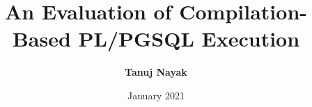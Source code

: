 \documentclass[12pt]{cmuthesis}
\begin{document}
 
\frontmatter

\pagestyle{empty}

\title{ %
{\bf An Evaluation of Compilation-Based PL/PGSQL Execution}}
\author{\textbf{Tanuj Nayak}}
\date{January 2021}


\support{}
\disclaimer{}



\maketitle

\begin{dedication}
\end{dedication}

\pagestyle{plain} %

\title{\paperTitle}
\end{document}

